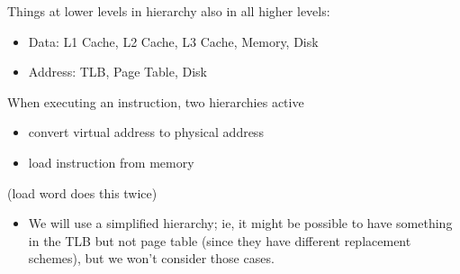 \newpage
\begin{frame}[fragile]


Things at lower levels in hierarchy also in all higher levels:
\begin{itemize}
		\item Data: L1 Cache, L2 Cache, L3 Cache, Memory, Disk
		\item Address: TLB, Page Table, Disk
\end{itemize}
When executing an instruction, two hierarchies active
\begin{itemize}
		\item convert virtual address to physical address
		\item load instruction from memory
\end{itemize}
(load word does this twice)
\BNotes\ifnum{}
\begin{itemize}
		\item We will use a simplified hierarchy; ie, it might be possible
			to have something in the TLB but not page table (since they
			have different replacement schemes), but we won't consider
			those cases.
\end{itemize}
\fi\ENotes
\end{frame}









